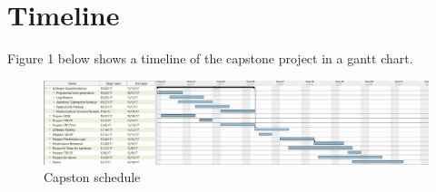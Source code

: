\documentclass[paper=usletter, fontsize=12pt]{article}
\begin{document}
\section{Timeline}Figure 1 below shows a timeline of the capstone project in a gantt chart. \\

\begin{figure}[h]
	\includegraphics[scale=0.45]{gnatt_chart}
	\caption{Capston schedule}

\end{figure}
\end{document}
